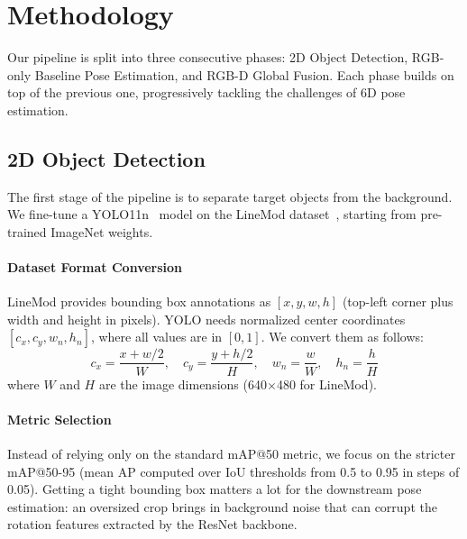 \section{Methodology}
\label{sec:method}

Our pipeline is split into three consecutive phases: 2D Object Detection, RGB-only Baseline Pose Estimation, and RGB-D Global Fusion. Each phase builds on top of the previous one, progressively tackling the challenges of 6D pose estimation.



\subsection{2D Object Detection}
\label{sec:method_detection}

The first stage of the pipeline is to separate target objects from the background. We fine-tune a YOLO11n~\cite{ultralytics2024yolo11} model on the LineMod dataset~\cite{hinterstoisser2012model}, starting from pre-trained ImageNet weights.

\paragraph{Dataset Format Conversion}
LineMod provides bounding box annotations as $[x, y, w, h]$ (top-left corner plus width and height in pixels). YOLO needs normalized center coordinates $[c_x, c_y, w_n, h_n]$, where all values are in $[0,1]$. We convert them as follows:
\begin{equation}
    c_x = \frac{x + w/2}{W}, \quad c_y = \frac{y + h/2}{H}, \quad w_n = \frac{w}{W}, \quad h_n = \frac{h}{H}
    \label{eq:bbox_conv}
\end{equation}
where $W$ and $H$ are the image dimensions (640$\times$480 for LineMod).

\paragraph{Metric Selection}
Instead of relying only on the standard mAP@50 metric, we focus on the stricter mAP@50-95 (mean AP computed over IoU thresholds from 0.5 to 0.95 in steps of 0.05). Getting a tight bounding box matters a lot for the downstream pose estimation: an oversized crop brings in background noise that can corrupt the rotation features extracted by the ResNet backbone.

